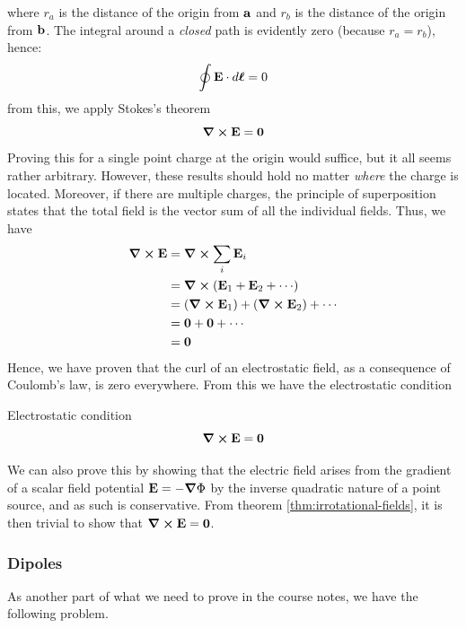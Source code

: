 			where $r_a$ is the distance of the origin from $\vb a$ and $r_b$ is
			the distance of the origin from $\vb b$. The integral around a \textit{closed}
			path is evidently zero (because $r_a=r_b$), hence:
			\begin{equation}
				\label{eq:ointEdl=0}	
				\oint \vb{E}\cdot\dd{\vb* \ell} = 0
			\end{equation}
			from this, we apply Stokes's theorem
			\begin{equation}
				\curl\vb{E} = \vb{0}
			\end{equation}
			Proving this for a single point charge at the origin would suffice, but 
			it all seems rather arbitrary. However, these results should hold no matter 
			\textit{where} the charge is located. Moreover, if there are multiple charges,
			the principle of superposition states that the total field is the vector sum 
			of all the individual fields. Thus, we have
			\begin{align*}
			    \curl\vb{E} 
				&=\curl\sum_i \vb{E}_i\\
				&=\curl\pqty{\vb{E}_1 + \vb{E}_2 + \cdots}\\
				&=(\curl \vb{E}_1) + (\curl \vb{E}_2) + \cdots\\
				&=\vb{0} + \vb{0} + \cdots\\
				&=\vb{0}
			\end{align*}
			Hence, we have proven that the curl of an electrostatic field,
			as a consequence of Coulomb's law, is zero everywhere. 
			From this we have the electrostatic condition
			\begin{theorem}{Electrostatic condition}
			   \begin{equation}
				   \curl\vb E = \vb{0}
			   \end{equation} 
			\end{theorem}
			
			
			\begin{remark}
			    We can also prove this by showing that the electric field arises from
				the gradient of a scalar field potential $\vb E = -\grad \Phi$ by the 
				inverse quadratic nature of a point source, and as such is conservative. From
				theorem \ref{thm:irrotational-fields}, it is then trivial to show
				that $\curl\vb E = \vb{0}$.
			\end{remark}
			\newpage
	\subsubsection{Dipoles}
		As another part of what we need to prove in the course notes, we have the following problem.

